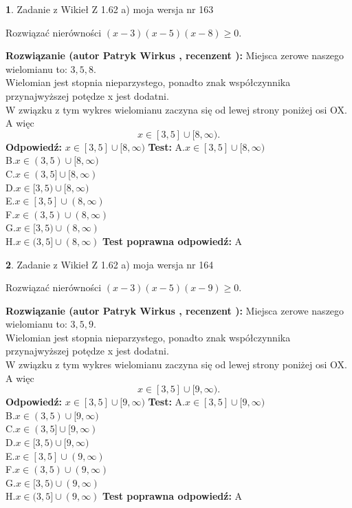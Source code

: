 \documentclass[12pt, a4paper]{article}
\theoremstyle{definition} %
\newtheorem{zad}{}
\newcommand{\zadStart}[1]{\begin{zad}#1\newline}
\newcommand{\zadStop}{\end{zad}}
\newcommand{\rozwStart}[2]{\noindent \textbf{Rozwiązanie (autor #1 , recenzent #2): }\newline}
\newcommand{\rozwStop}{\newline}
\newcommand{\odpStart}{\noindent \textbf{Odpowiedź:}\newline}
\newcommand{\odpStop}{\newline}
\newcommand{\testStart}{\noindent \textbf{Test:}\newline}
\newcommand{\testStop}{\newline}
\newcommand{\kluczStart}{\noindent \textbf{Test poprawna odpowiedź:}\newline}
\newcommand{\kluczStop}{\newline}
\begin{document}
\zadStart{Zadanie z Wikieł Z 1.62 a) moja wersja nr 163}

Rozwiązać nierówności $(x-3)(x-5)(x-8)\ge0$.
\zadStop
\rozwStart{Patryk Wirkus}{}
Miejsca zerowe naszego wielomianu to: $3, 5, 8$.\\
Wielomian jest stopnia nieparzystego, ponadto znak współczynnika przy\linebreak najwyższej potędze x jest dodatni.\\ W związku z tym wykres wielomianu zaczyna się od lewej strony poniżej osi OX. A więc $$x \in [3,5] \cup [8,\infty).$$
\rozwStop
\odpStart
$x \in [3,5] \cup [8,\infty)$
\odpStop
\testStart
A.$x \in [3,5] \cup [8,\infty)$\\
B.$x \in (3,5) \cup [8,\infty)$\\
C.$x \in (3,5] \cup [8,\infty)$\\
D.$x \in [3,5) \cup [8,\infty)$\\
E.$x \in [3,5] \cup (8,\infty)$\\
F.$x \in (3,5) \cup (8,\infty)$\\
G.$x \in [3,5) \cup (8,\infty)$\\
H.$x \in (3,5] \cup (8,\infty)$
\testStop
\kluczStart
A
\kluczStop



\zadStart{Zadanie z Wikieł Z 1.62 a) moja wersja nr 164}

Rozwiązać nierówności $(x-3)(x-5)(x-9)\ge0$.
\zadStop
\rozwStart{Patryk Wirkus}{}
Miejsca zerowe naszego wielomianu to: $3, 5, 9$.\\
Wielomian jest stopnia nieparzystego, ponadto znak współczynnika przy\linebreak najwyższej potędze x jest dodatni.\\ W związku z tym wykres wielomianu zaczyna się od lewej strony poniżej osi OX. A więc $$x \in [3,5] \cup [9,\infty).$$
\rozwStop
\odpStart
$x \in [3,5] \cup [9,\infty)$
\odpStop
\testStart
A.$x \in [3,5] \cup [9,\infty)$\\
B.$x \in (3,5) \cup [9,\infty)$\\
C.$x \in (3,5] \cup [9,\infty)$\\
D.$x \in [3,5) \cup [9,\infty)$\\
E.$x \in [3,5] \cup (9,\infty)$\\
F.$x \in (3,5) \cup (9,\infty)$\\
G.$x \in [3,5) \cup (9,\infty)$\\
H.$x \in (3,5] \cup (9,\infty)$
\testStop
\kluczStart
A
\kluczStop
\end{document}

